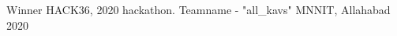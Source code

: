 

\begin{cvhonors}

  \cvhonor
    {Winner} %
    {HACK36, 2020 hackathon. Teamname - "all\_kavs"} %
    {MNNIT, Allahabad} %
    {2020} %
  



\end{cvhonors}
